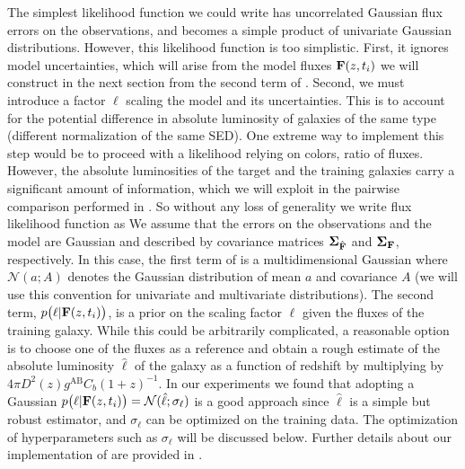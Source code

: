 \documentclass[aps,prd,showpacs,superscriptaddress,groupedaddress]{revtex4}  %
\begin{document}
The simplest likelihood function we could write has uncorrelated Gaussian flux errors on the observations, and becomes a simple product of univariate Gaussian distributions.
However, this likelihood function is too simplistic.
First, it ignores model uncertainties, which will arise from the model fluxes $\mat{F}(z, t_i)$ we will construct in the next section from the second term of .
Second, we must introduce a factor $\ell$ scaling the model and its uncertainties. 
This is to account for the potential difference in absolute luminosity of galaxies of the same type (\ie different normalization of the same SED).
One extreme way to implement this step would be to proceed with a likelihood relying on colors, \ie ratio of fluxes.
However, the absolute luminosities of the target and the training galaxies carry a significant amount of information, which we will exploit in the pairwise comparison performed in .
So without any loss of generality we write flux likelihood function as
We assume that the errors on the observations and the model are Gaussian and described by covariance matrices $\mat{\Sigma}_{\hat{\mat{F}}}$ and $\mat{\Sigma_{{\mat{F}}}}$, respectively. 
In this case, the first term of  is a multidimensional Gaussian 
where $\mathcal{N}(a;A)$ denotes the Gaussian distribution of mean $a$ and covariance $A$ (we will use this convention for univariate and multivariate distributions).
The second term, $p\bigl(\ell | \mat{F}(z, t_i)\bigr)$, is a prior on the scaling factor $\ell$ given the fluxes of the training galaxy. 
While this could be arbitrarily complicated, a reasonable option is to choose one of the fluxes as a reference and obtain a rough estimate of the absolute luminosity $\hat{\ell}$ of the galaxy as a function of redshift by multiplying by $ 4\pi D^2(z) g^\mathrm{AB} C_b (1+z)^{-1}$.  
In our experiments we found that adopting a Gaussian $p\bigl(\ell | \mat{F}(z, t_i)\bigr) =  \mathcal{N}(\hat{\ell}; \sigma_\ell)$ is a good approach since $\hat{\ell}$ is a simple but robust estimator, and $\sigma_\ell$ can be optimized on the training data.
The optimization of hyperparameters such as $\sigma_\ell$ will be discussed below. 
Further details about our implementation of  are provided in .
\end{document}
